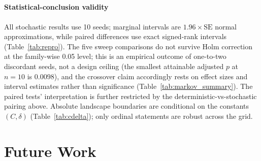 \documentclass[sensors,article,submit,pdftex,moreauthors]{Definitions/mdpi}
\providecommand{\DIFadd}[1]{{\protect\color{blue}#1}} %
\providecommand{\DIFdel}[1]{} %
\providecommand{\DIFaddbegin}{} %
\providecommand{\DIFaddend}{} %
\providecommand{\DIFdelbegin}{} %
\providecommand{\DIFdelend}{} %
\begin{document}
\DIFdelbegin \subsection{\DIFdel{Future Work}}
\addtocounter{subsection}{-1}%
\DIFdelend \DIFaddbegin \paragraph{\DIFadd{Statistical-conclusion validity}} \DIFadd{All stochastic results use 10 seeds; marginal intervals are $1.96 \times \mathrm{SE}$ normal approximations, while paired differences use exact signed-rank intervals (Table~\ref{tab:repro}). The five sweep comparisons do not survive Holm correction at the family-wise 0.05 level; this is an empirical outcome of one-to-two discordant seeds, not a design ceiling (the smallest attainable adjusted $p$ at $n = 10$ is $0.0098$), and the crossover claim accordingly rests on effect sizes and interval estimates rather than significance (Table~\ref{tab:markov_summary}). The paired tests' interpretation is further restricted by the deterministic-vs-stochastic pairing above. Absolute landscape boundaries are conditional on the constants $(C, \delta)$ (Table~\ref{tab:cdelta}); only ordinal statements are robust across the grid.
}


\section{\DIFadd{Future Work}}
\DIFaddend \label{sec:future_work}
\end{document}
